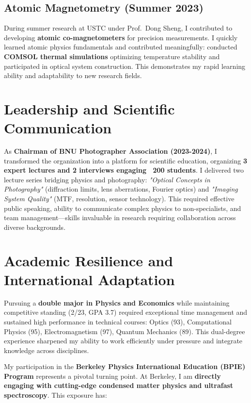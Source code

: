 \documentclass[11pt,a4paper]{article}
\begin{document}
\subsection{Atomic Magnetometry (Summer 2023)}

During summer research at USTC under Prof.~Dong Sheng, I contributed to developing \textbf{atomic co-magnetometers} for precision measurements. I quickly learned atomic physics fundamentals and contributed meaningfully: conducted \textbf{COMSOL thermal simulations} optimizing temperature stability and participated in optical system construction. This demonstrates my rapid learning ability and adaptability to new research fields.

\section{Leadership and Scientific Communication}

As \textbf{Chairman of BNU Photographer Association (2023-2024)}, I transformed the organization into a platform for scientific education, organizing \textbf{3 expert lectures and 2 interviews engaging ~200 students}. I delivered two lecture series bridging physics and photography: \textit{"Optical Concepts in Photography"} (diffraction limits, lens aberrations, Fourier optics) and \textit{"Imaging System Quality"} (MTF, resolution, sensor technology). This required effective public speaking, ability to communicate complex physics to non-specialists, and team management—skills invaluable in research requiring collaboration across diverse backgrounds.

\section{Academic Resilience and International Adaptation}

Pursuing a \textbf{double major in Physics and Economics} while maintaining competitive standing (2/23, GPA 3.7) required exceptional time management and sustained high performance in technical courses: Optics (93), Computational Physics (95), Electromagnetism (97), Quantum Mechanics (89). This dual-degree experience sharpened my ability to work efficiently under pressure and integrate knowledge across disciplines.

My participation in the \textbf{Berkeley Physics International Education (BPIE) Program} represents a pivotal turning point. At Berkeley, I am \textbf{directly engaging with cutting-edge condensed matter physics and ultrafast spectroscopy}. This exposure has:
\end{document}
